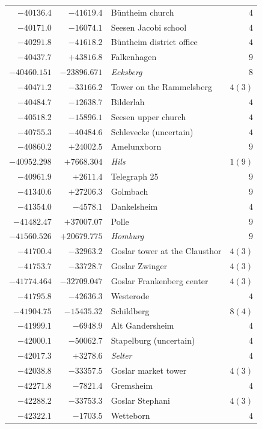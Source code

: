 \begin{center}
\begin{tabular}{r|r|p{170pt}|r}
\(-40136.4\)&\(-41619.4\)&Büntheim church&\(4\)\\
\(-40171.0\)&\(-16074.1\)&Seesen Jacobi school&\(4\)\\
\(-40291.8\)&\(-41618.2\)&Büntheim district office&\(4\)\\
\(-40437.7\)&\(+43816.8\)&Falkenhagen&\(9\)\\
\(-40460.151\)&\(-23896.671\)&\textit{Ecksberg}&\(8\)\\
\(-40471.2\)&\(-33166.2\)&Tower on the Rammelsberg&\(4 (3)\)\\
\(-40484.7\)&\(-12638.7\)&Bilderlah&\(4\)\\
\(-40518.2\)&\(-15896.1\)&Seesen upper church&\(4\)\\
\(-40755.3\)&\(-40484.6\)&Schlevecke (uncertain)&\(4\)\\
\(-40860.2\)&\(+24002.5\)&Amelunxborn&\(9\)\\
\(-40952.298\)&\(+7668.304\)&\textit{Hils}&\(1 (9)\)\\
\(-40961.9\)&\(+2611.4\)&Telegraph 25&\(9\)\\
\(-41340.6\)&\(+27206.3\)&Golmbach&\(9\)\\
\(-41354.0\)&\(-4578.1\)&Dankelsheim&\(4\)\\
\(-41482.47\)&\(+37007.07\)&Polle&\(9\)\\
\(-41560.526\)&\(+20679.775\)&\textit{Homburg}&\(9\)\\
\(-41700.4\)&\(-32963.2\)&Goslar tower at the Clausthor&\(4 (3)\)\\
\(-41753.7\)&\(-33728.7\)&Goslar Zwinger&\(4 (3)\)\\
\(-41774.464\)&\(-32709.047\)&Goslar Frankenberg center&\(4 (3)\)\\
\(-41795.8\)&\(-42636.3\)&Westerode&\(4\)\\
\(-41904.75\)&\(-15435.32\)&Schildberg&\(8 (4)\)\\
\(-41999.1\)&\(-6948.9\)&Alt Gandersheim&\(4\)\\
\(-42000.1\)&\(-50062.7\)&Stapelburg (uncertain)&\(4\)\\
\(-42017.3\)&\(+3278.6\)&\textit{Selter}&\(4\)\\
\(-42038.8\)&\(-33357.5\)&Goslar market tower&\(4 (3)\)\\
\(-42271.8\)&\(-7821.4\)&Gremsheim&\(4\)\\
\(-42288.2\)&\(-33753.3\)&Goslar Stephani&\(4 (3)\)\\
\(-42322.1\)&\(-1703.5\)&Wetteborn&\(4\)\\
\hline\end{tabular}\endgroup\end{center}
